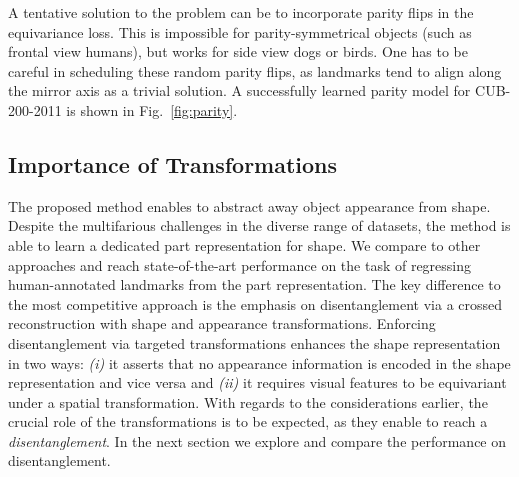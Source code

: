 			A tentative solution to the problem can be to incorporate parity flips in the equivariance loss. This is impossible for parity-symmetrical objects (such as frontal view humans), but works \eg for side view dogs or birds. One has to be careful in scheduling these random parity flips, as landmarks tend to align along the mirror axis as a trivial solution. A successfully learned parity model for CUB-200-2011 is shown in Fig.~\ref{fig:parity}.

		\subsection{Importance of Transformations}
			The proposed method enables to abstract away object appearance from shape.
			Despite the multifarious challenges in the diverse range of datasets, the method is able to learn a dedicated part representation for shape.
			We compare to other approaches and reach state-of-the-art performance on the task of regressing human-annotated landmarks from the part representation.
			The key difference to the most competitive approach \cite{zhang18} is the emphasis on disentanglement via a crossed reconstruction with shape and appearance transformations.
			Enforcing disentanglement via targeted transformations enhances the shape representation in two ways: \emph{(i)} it asserts that no appearance information is encoded in the shape representation and vice versa and \emph{(ii)} it requires visual features to be equivariant under a spatial transformation.
			With regards to the considerations earlier, the crucial role of the transformations is to be expected, as they enable to reach a \textit{disentanglement}. In the next section we explore and compare the performance on disentanglement.


